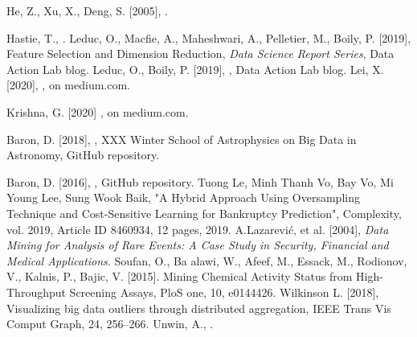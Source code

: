 \begin{thebibliography}{99}
 He, Z., Xu, X.,  Deng, S. [2005], . 

 Hastie, T., .
 Leduc, O., Macfie, A., Maheshwari, A., Pelletier, M., Boily, P. [2019], Feature Selection and Dimension Reduction, \textit{Data Science Report Series}, Data Action Lab blog. 
 Leduc, O., Boily, P. [2019], , Data Action Lab blog.
 Lei, X. [2020], , on medium.com.

 Krishna, G. [2020] , on medium.com.

 Baron, D. [2018],  , XXX Winter School of Astrophysics on Big Data in Astronomy, GitHub repository.

 Baron, D. [2016], , GitHub repository.
 Tuong Le, Minh Thanh Vo, Bay Vo, Mi Young Lee, Sung Wook Baik, "A Hybrid Approach Using Oversampling Technique and Cost-Sensitive Learning for Bankruptcy Prediction", Complexity, vol. 2019, Article ID 8460934, 12 pages, 2019.
 A.Lazarević, {et al.} [2004], \textit{Data Mining for Analysis of Rare Events: A Case Study in Security, Financial and Medical Applications}.
 Soufan, O., Ba alawi, W.,   Afeef, M., Essack, M., Rodionov, V., Kalnis, P., Bajic, V. [2015]. Mining Chemical Activity Status from High-Throughput Screening Assays, PloS one,  10, e0144426. 
 Wilkinson L. [2018], Visualizing big data outliers through distributed aggregation, IEEE Trans Vis Comput Graph, 24, 256–266. 
 Unwin, A., .
\end{thebibliography}








